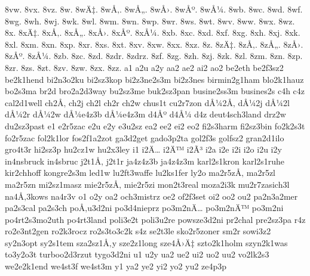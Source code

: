 {8vw.
8vx.
8vz.
8w.
8wÄ‡.
8wÅ‚.
8wÅ„.
8wÅ›.
8wÅº.
8wÅ¼.
8wb.
8wc.
8wd.
8wf.
8wg.
8wh.
8wj.
8wk.
8wl.
8wm.
8wn.
8wp.
8wr.
8ws.
8wt.
8wv.
8ww.
8wx.
8wz.
8x.
8xÄ‡.
8xÅ‚.
8xÅ„.
8xÅ›.
8xÅº.
8xÅ¼.
8xb.
8xc.
8xd.
8xf.
8xg.
8xh.
8xj.
8xk.
8xl.
8xm.
8xn.
8xp.
8xr.
8xs.
8xt.
8xv.
8xw.
8xx.
8xz.
8z.
8zÄ‡.
8zÅ‚.
8zÅ„.
8zÅ›.
8zÅº.
8zÅ¼.
8zb.
8zc.
8zd.
8zdr.
8zdrz.
8zf.
8zg.
8zh.
8zj.
8zk.
8zl.
8zm.
8zn.
8zp.
8zr.
8zs.
8zt.
8zv.
8zw.
8zx.
8zz.
a1
a2u
a2y
aa2
ae2
ai2
ao2
be2eth
be2f3sz2
be2k1hend
bi2n3o2ku
bi2sz3kop
bi2z3ne2s3m
bi2z3nes
birmin2g1ham
blo2k1hauz
bo2s3ma
br2d
bro2a2d3way
bu2sz3me
buk2sz3pan
busine2ss3m
busines2s
c4h
c4z
cal2d1well
ch2Å‚
ch2j
ch2l
ch2r
ch2w
chus1t
cu2r7zon
dÅ¼2Å‚
dÅ¼2j
dÅ¼2l
dÅ¼2r
dÅ¼2w
dÅ¼e4z3b
dÅ¼e4z3m
d4Åº
d4Å¼
d4z
deut4sch3land
drz2w
du2sz3past
e1
e2r5zac
e2u
e2y
e3u2sz
ea2
ee2
ei2
eo2
fi2s3harm
fi2sz3bin
fo2k2s3t
fo2r5zac
fol2k1lor
fos2f1a2zot
ga3d2get
gado3p2ta
gol2f3s
golfsz2
gran2d1ilo
gro4t3r
hi2sz3p
hu2cz1w
hu2x3ley
i1
i2Ä…
i2Ä™
i2Ã³
i2a
i2e
i2i
i2o
i2u
i2y
in4nsbruck
in4sbruc
j2t1Å‚
j2t1r
ja4z4z3b
ja4z4z3m
karl2s1kron
karl2s1ruhe
kir2chhoff
kongre2s3m
led1w
lu2ft3waffe
lu2ks1fer
ly2o
ma2r5zÅ‚
ma2r5zl
ma2r5zn
mi2sz1masz
mie2r5zÅ‚
mie2r5zi
mon2t3real
moza2i3k
mu2r7zasich3l
na4Å‚3kows
na4r3v
o1
o2y
oa2
och3mistrz
oe2
of2f3set
oi2
oo2
ou2
pa2n3a2mer
pa2s3cal
pa2s3ch
poÅ‚u3d2ni
po3d4nieprz
po3m2nÄ…
po3m2nÄ™
po3m2ni
po4rt2s3mo2uth
po4rt3land
poli3e2t
poli3u2re
powsze3d2ni
pr2chal
pre2sz3pa
r4z
ro2e3nt2gen
ro2k3rocz
ro2s3to3c2k
s4z
se2t3le
sko2r5zoner
sm2r
sowi3z2
sy2n3opt
sy2s1tem
sza2sz1Å‚y
sze2z1long
sze4Å›Ä‡
szto2k1holm
szyn2k1was
to3y2o3t
turboo2d3rzut
tygo3d2ni
u1
u2y
ua2
ue2
ui2
uo2
uu2
vo2lk2s3
we2e2k1end
we4st3f
we4st3m
y1
ya2
ye2
yi2
yo2
yu2
ze4p3p
}
